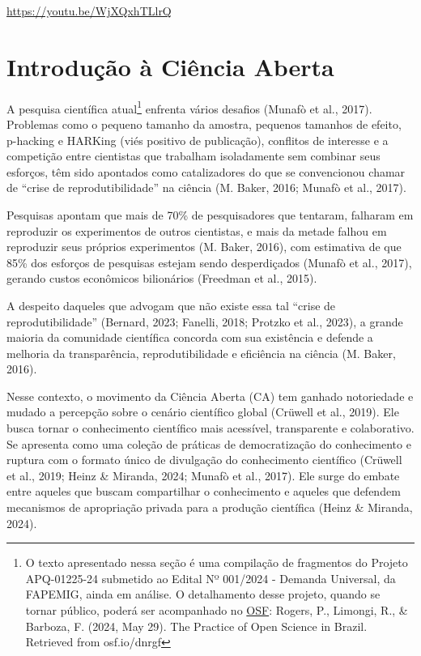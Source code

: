 \documentclass[
  a4paper,
]{book}
\begin{document}
\url{https://youtu.be/WjXQxhTLlrQ}


\chapter{Introdução à Ciência Aberta}\label{sec-intro}

A pesquisa científica atual\footnote{O texto apresentado nessa seção é
  uma compilação de fragmentos do Projeto APQ-01225-24 submetido ao
  Edital Nº 001/2024 - Demanda Universal, da FAPEMIG, ainda em análise.
  O detalhamento desse projeto, quando se tornar público, poderá ser
  acompanhado no \href{http://osf.io/dnrgf}{OSF}: Rogers, P., Limongi,
  R., \& Barboza, F. (2024, May 29). The Practice of Open Science in
  Brazil. Retrieved from osf.io/dnrgf} enfrenta vários desafios (Munafò
et al., 2017). Problemas como o pequeno tamanho da amostra, pequenos
tamanhos de efeito, p-hacking e HARKing (viés positivo de publicação),
conflitos de interesse e a competição entre cientistas que trabalham
isoladamente sem combinar seus esforços, têm sido apontados como
catalizadores do que se convencionou chamar de ``crise de
reprodutibilidade'' na ciência (M. Baker, 2016; Munafò et al., 2017).

Pesquisas apontam que mais de 70\% de pesquisadores que tentaram,
falharam em reproduzir os experimentos de outros cientistas, e mais da
metade falhou em reproduzir seus próprios experimentos (M. Baker, 2016),
com estimativa de que 85\% dos esforços de pesquisas estejam sendo
desperdiçados (Munafò et al., 2017), gerando custos econômicos
bilionários (Freedman et al., 2015).

A despeito daqueles que advogam que não existe essa tal ``crise de
reprodutibilidade'' (Bernard, 2023; Fanelli, 2018; Protzko et al.,
2023), a grande maioria da comunidade científica concorda com sua
existência e defende a melhoria da transparência, reprodutibilidade e
eficiência na ciência (M. Baker, 2016).

Nesse contexto, o movimento da Ciência Aberta (CA) tem ganhado
notoriedade e mudado a percepção sobre o cenário científico global
(Crüwell et al., 2019). Ele busca tornar o conhecimento científico mais
acessível, transparente e colaborativo. Se apresenta como uma coleção de
práticas de democratização do conhecimento e ruptura com o formato único
de divulgação do conhecimento científico (Crüwell et al., 2019; Heinz \&
Miranda, 2024; Munafò et al., 2017). Ele surge do embate entre aqueles
que buscam compartilhar o conhecimento e aqueles que defendem mecanismos
de apropriação privada para a produção científica (Heinz \& Miranda,
2024).
\end{document}
